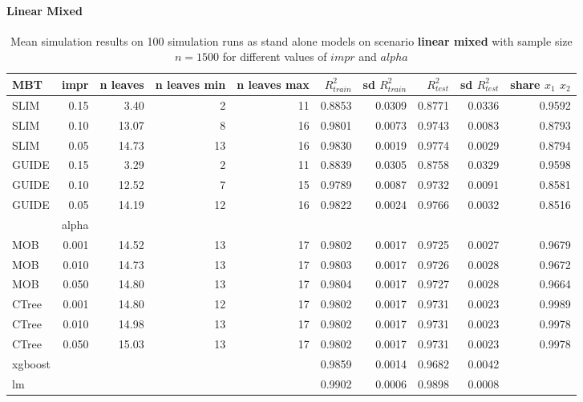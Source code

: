 \paragraph{Linear Mixed}
\begin{table}[!htb]
\caption{Mean simulation results on 100 simulation runs as stand alone models on scenario \textbf{linear mixed} with sample size $n = 1500$ for different values of $impr$ and $alpha$}
\centering \tiny
\begin{tabular}[t]{l|r|r|r|r|r|r|r|r|r}
\hline


MBT & impr  & n leaves & n leaves min & n leaves max & $R^2_{train}$ & sd $R^2_{train}$ & $R^2_{test}$ & sd $R^2_{test}$ & share $x_1$ $x_2$\\
\hline

SLIM & 0.15 & 3.40 & 2 & 11 & 0.8853 & 0.0309 & 0.8771 & 0.0336 & 0.9592\\
SLIM & 0.10 & 13.07 & 8 & 16 & 0.9801 & 0.0073 & 0.9743 & 0.0083 & 0.8793\\
SLIM & 0.05 & 14.73 & 13 & 16 & 0.9830 & 0.0019 & 0.9774 & 0.0029 & 0.8794\\
GUIDE & 0.15 & 3.29 & 2 & 11 & 0.8839 & 0.0305 & 0.8758 & 0.0329 & 0.9598\\
GUIDE & 0.10 & 12.52 & 7 & 15 & 0.9789 & 0.0087 & 0.9732 & 0.0091 & 0.8581\\
GUIDE & 0.05 & 14.19 & 12 & 16 & 0.9822 & 0.0024 & 0.9766 & 0.0032 & 0.8516\\

\hline

& alpha & & & & & & & \\
\hline

MOB & 0.001 & 14.52 & 13 & 17 & 0.9802 & 0.0017 & 0.9725 & 0.0027 & 0.9679\\
MOB & 0.010 & 14.73 & 13 & 17 & 0.9803 & 0.0017 & 0.9726 & 0.0028 & 0.9672\\
MOB & 0.050 & 14.80 & 13 & 17 & 0.9804 & 0.0017 & 0.9727 & 0.0028 & 0.9664\\

CTree & 0.001 & 14.80 & 12 & 17 & 0.9802 & 0.0017 & 0.9731 & 0.0023 & 0.9989\\
CTree & 0.010 & 14.98 & 13 & 17 & 0.9802 & 0.0017 & 0.9731 & 0.0023 & 0.9978\\
CTree & 0.050 & 15.03 & 13 & 17 & 0.9802 & 0.0017 & 0.9731 & 0.0023 & 0.9978\\
\hline

xgboost & & & & & 0.9859 & 0.0014 & 0.9682 & 0.0042 &\\
lm & & & & & 0.9902 & 0.0006 & 0.9898 & 0.0008 &\\
\hline


\end{tabular}
\label{tab:linear_mixed_summary}
\end{table}

